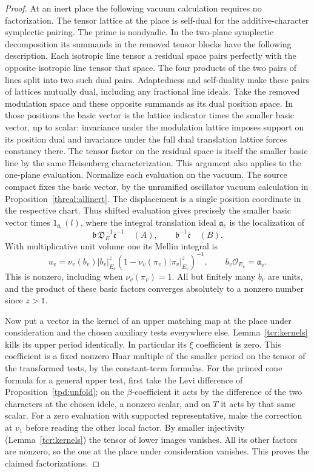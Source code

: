 \begin{proof}
At an inert place the following vacuum calculation requires no
factorization. The tensor lattice at the place is self-dual for
the additive-character symplectic pairing. The prime is nondyadic.
In the two-plane symplectic decomposition its summands in the
removed tensor blocks have the following description. Each isotropic
line tensor a residual space pairs perfectly with the opposite
isotropic line tensor that space. The four products of the two pairs
of lines split into two such dual pairs. Adaptedness and self-duality
make these pairs of lattices mutually dual, including any fractional
line ideals. Take the removed modulation space and these opposite
summands as its dual position space. In those positions the basic
vector is the lattice indicator times the smaller basic vector,
up to scalar: invariance under the modulation lattice imposes
support on its position dual and invariance under the full dual
translation lattice forces constancy there. The tensor factor on
the residual space is itself the smaller basic line by the same
Heisenberg characterization. This argument also applies to the
one-plane evaluation. Normalize each evaluation on the vacuum.
The source compact fixes the basic vector, by the unramified
oscillator vacuum calculation in Proposition~\ref{threal:allinert}.
The displacement is a single position coordinate in the respective
chart. Thus shifted evaluation gives precisely the smaller basic
vector times \(1_{\mathfrak a_v}(l)\), where the integral translation
ideal \(\mathfrak a_v\) is the localization of
\[
 \mathfrak b\,\mathfrak D_E^{-1}\bar{\mathfrak c}^{-1}
       \quad(A),\qquad \mathfrak b^{-1}\bar{\mathfrak c}\quad(B).
\]
With multiplicative unit volume one its Mellin integral is
\[
  u_v=\nu_v(b_v)|b_v|_{E_v}^{z}
           (1-\nu_v(\pi_v)|\pi_v|_{E_v}^{z})^{-1},
        \qquad b_v\mathcal O_{E_v}=\mathfrak a_v .
\]
This is nonzero, including when \(\nu_v(\pi_v)=1\). All but
finitely many \(b_v\) are units, and the product of these basic
factors converges absolutely to a nonzero number since \(z>1\).

Now put a vector in the kernel of an upper matching map at the
place under consideration and the chosen auxiliary tests everywhere
else. Lemma~\ref{tcr:kernels} kills its upper period identically.
In particular its \(\xi\) coefficient is zero. This coefficient
is a fixed nonzero Haar multiple of the smaller period on the
tensor of the transformed tests, by the constant-term formulas.
For the primed cone formula for a general upper test, first take
the Levi difference of Proposition~\ref{tpd:unfold}; on the
\(\beta\)-coefficient it acts by the difference of the two
characters at the chosen idele, a nonzero scalar, and on \(T\)
it acts by that same scalar. For a zero evaluation with supported
representative, make the correction at \(v_1\) before reading the
other local factor. By smaller injectivity
(Lemma~\ref{tcr:kernels}) the tensor of lower images vanishes.
All its other factors are nonzero, so the one at the place under
consideration vanishes. This proves the claimed factorizations.


\end{proof}
